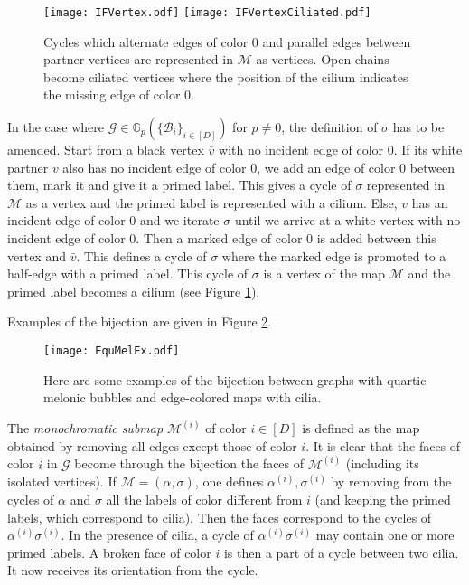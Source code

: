 \documentclass[aps,prd,10pt,notitlepage,nofootinbib,superscriptaddress,showkeys,showpacs]{revtex4-1}
\begin{document}
\begin{figure}
\texttt{[image: IFVertex.pdf]}\hspace{2cm}
\texttt{[image: IFVertexCiliated.pdf]}
\caption{\label{fig:IFVertex} Cycles which alternate edges of color 0 and parallel edges between partner vertices are represented in ${\mathcal{M}}$ as vertices. Open chains become ciliated vertices where the position of the cilium indicates the missing edge of color 0.}
\end{figure}

In the case where ${\mathcal{G}}\in{\mathbb{G}}_p(\{{\mathcal{B}}_i\}_{i\in [D]})$ for $p\neq0$, the definition of $\sigma$ has to be amended. Start from a black vertex $\bar{v}$ with no incident edge of color 0. If its white partner $v$ also has no incident edge of color 0, we add an edge of color 0 between them, mark it and give it a primed label. This gives a cycle of $\sigma$ represented in ${\mathcal{M}}$ as a vertex and the primed label is represented with a cilium. Else, $v$ has an incident edge of color 0 and we iterate $\sigma$ until we arrive at a white vertex with no incident edge of color 0. Then a marked edge of color 0 is added between this vertex and $\bar{v}$. This defines a cycle of $\sigma$ where the marked edge is promoted to a half-edge with a primed label. This cycle of $\sigma$ is a vertex of the map ${\mathcal{M}}$ and the primed label becomes a cilium (see Figure \ref{fig:IFVertex}).

Examples of the bijection are given in Figure \ref{fig:EquMelEx}.

\begin{figure}
\texttt{[image: EquMelEx.pdf]}
\caption{\label{fig:EquMelEx} Here are some examples of the bijection between graphs with quartic melonic bubbles and edge-colored maps with cilia.}
\end{figure}

The \emph{monochromatic submap ${\mathcal{M}}^{(i)}$} of color $i\in [D]$ is defined as the map obtained by removing all edges except those of color $i$. It is clear that the faces of color $i$ in ${\mathcal{G}}$ become through the bijection the faces of ${\mathcal{M}}^{(i)}$ (including its isolated vertices). If ${\mathcal{M}} = (\alpha, \sigma)$, one defines $\alpha^{(i)}, \sigma^{(i)}$ by removing from the cycles of $\alpha$ and $\sigma$ all the labels of color different from $i$ (and keeping the primed labels, which correspond to cilia). Then the faces correspond to the cycles of $\alpha^{(i)} \sigma^{(i)}$. In the presence of cilia, a cycle of $\alpha^{(i)} \sigma^{(i)}$ may contain one or more primed labels. A broken face of color $i$ is then a part of a cycle between two cilia. It now receives its orientation from the cycle.
\end{document}
